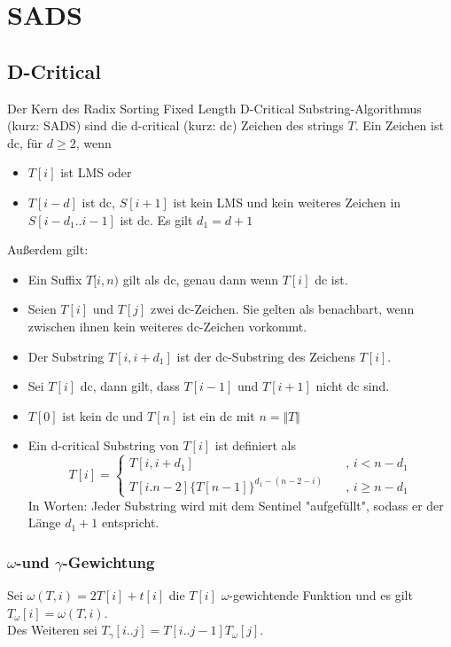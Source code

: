 \section{SADS}
\subsection{D-Critical}
\label{dc}
Der  Kern des Radix Sorting Fixed Length D-Critical Substring-Algorithmus\cite[ch.~4.1]{saca:6} (kurz: SADS) sind die d-critical (kurz: dc) Zeichen des strings $T$. Ein Zeichen ist dc, für $d \geq 2$, wenn
\begin{itemize}
    \item $T[i]$ ist LMS oder
    \item $T[i-d]$ ist dc, $S[i+1]$ ist kein LMS und kein weiteres Zeichen in $S[i-d_1..i-1]$ ist dc. Es gilt $d_1=d+1$
\end{itemize}
\bigskip
Außerdem gilt:
\begin{itemize}
    \item   Ein Suffix $T[i,n)$ gilt als dc, genau dann wenn $T[i]$ dc ist.
    \item   Seien $T[i]$ und $T[j]$ zwei dc-Zeichen. Sie gelten als benachbart, wenn zwischen ihnen kein weiteres dc-Zeichen vorkommt.
    \item   Der Substring $T[i, i+d_1]$ ist der dc-Substring des Zeichens $T[i]$.
    \item   Sei $T[i]$ dc, dann gilt, dass $T[i-1]$ und $T[i+1]$ nicht dc sind.
    \item   $T[0]$ ist kein dc und $T[n]$ ist ein dc mit $n=\Vert T \Vert$
    \item   Ein d-critical Substring von $T[i]$ ist definiert als
            \[ T[i] =
              \begin{cases}
                T[i, i+d_1]       & \quad \text{, } i<n-d_1\\
                T[i. n-2]\{T[n-1]\}^{d_1-(n-2-i)}  & \quad \text{, } i\geq n-d_1
              \end{cases}
            \]
            In Worten: Jeder Substring wird mit dem Sentinel "aufgefüllt", sodass er der Länge $d_1+1$ entspricht.
\end{itemize}
\subsubsection{$\omega$-und $\gamma$-Gewichtung}
\label{weighting}
Sei $\omega(T,i)=2T[i]+t[i]$ die $T[i]$ $\omega$-gewichtende Funktion und es gilt $T_\omega[i]=\omega(T,i)$.
\\Des Weiteren sei $T_\gamma[i..j]=T[i..j-1]T_\omega[j]$.
\newpage
